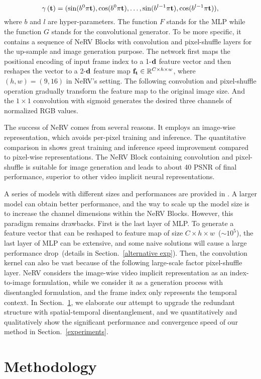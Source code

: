 \documentclass[runningheads]{llncs}
\begin{document}
\begin{equation}
    \gamma\left(\mathbf{t}\right) = (\sin(b^0\pi\mathbf{t}), \cos(b^0\pi\mathbf{t}), \dots, \sin(b^{l-1}\pi\mathbf{t}), \cos(b^{l-1}\pi\mathbf{t})),
    \label{formula:pe}
\end{equation}
where $b$ and $l$ are hyper-parameters. The function $F$ stands for the MLP while the function $G$ stands for the convolutional generator. To be more specific, it contains a sequence of NeRV Blocks with convolution and pixel-shuffle layers for the up-sample and image generation purpose. The network first maps the positional encoding of input frame index to a 1-$\mathbf{d}$ feature vector and then reshapes the vector to a 2-$\mathbf{d}$ feature map $\mathbf{f}_{\mathbf{t}}\in \mathbb{R}^{C\times h\times w}$, where $(h, w)=(9, 16)$ in NeRV's setting. The following convolution and pixel-shuffle operation gradually transform the feature map to the original image size. And the $1\times1$ convolution with sigmoid generates the desired three channels of normalized RGB values.

The success of NeRV comes from several reasons. It employs an image-wise representation, which avoids per-pixel training and inference. The quantitative comparison in \cite{chen2021nerv} shows great training and inference speed improvement compared to pixel-wise representations. The NeRV Block containing convolution and pixel-shuffle is suitable for image generation and leads to about 40 PSNR of final performance, superior to other video implicit neural representations.

A series of models with different sizes and performances are provided in \cite{chen2021nerv}. A larger model can obtain better performance, and the way to scale up the model size is to increase the channel dimensions within the NeRV Blocks.
However, this paradigm remains drawbacks. First is the last layer of MLP. To generate a feature vector that can be reshaped to feature map of size $C\times h\times w$~($\sim 10^5$), the last layer of MLP can be extensive, and some naive solutions will cause a large performance drop~(details in Section.~\ref{alternative exp}). Then, the convolution kernel can also be vast because of the following large-scale factor pixel-shuffle layer. NeRV considers the image-wise video implicit representation as an index-to-image formulation, while we consider it as a generation process with disentangled formulation, and the frame index only represents the temporal context. In Section.~\ref{method}, we elaborate our attempt to upgrade the redundant structure with spatial-temporal disentanglement, and we quantitatively and qualitatively show the significant performance and convergence speed of our method in Section.~\ref{experiments}. \section{Methodology}
\label{method}
\end{document}
